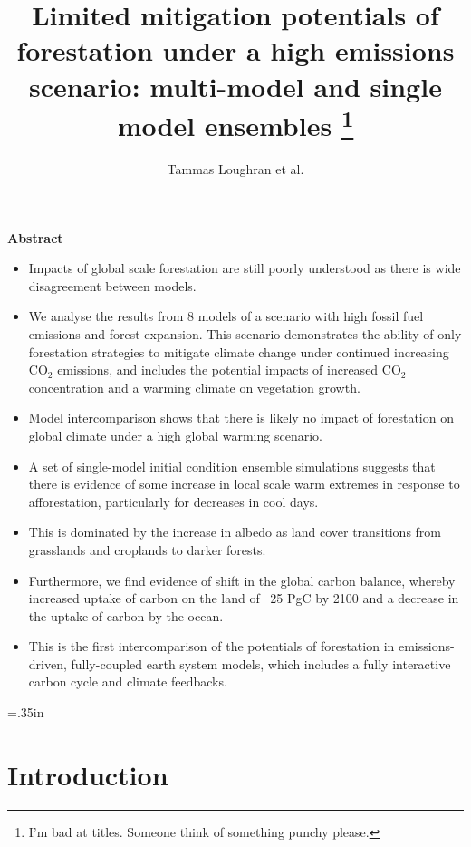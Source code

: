 \documentclass[]{article}
\title{Limited mitigation potentials of forestation under a high emissions scenario: multi-model and single model ensembles \footnote{I'm bad at titles. Someone think of something punchy please.}}
\author{Tammas Loughran et al.}
\begin{document}
\maketitle

\begin{center}
    \Large
    \vspace{0.9cm}
    \textbf{Abstract}
\end{center}

\begin{itemize}
    \item Impacts of global scale forestation are still poorly understood as there is wide disagreement between models.
    \item We analyse the results from 8 models of a scenario with high fossil fuel emissions and forest expansion. This scenario demonstrates the ability of only forestation strategies to mitigate climate change under continued increasing CO$_2$ emissions, and includes the potential impacts of increased CO$_2$ concentration and a warming climate on vegetation growth.
    \item Model intercomparison shows that there is likely no impact of forestation on global climate under a high global warming scenario.
    \item A set of single-model initial condition ensemble simulations suggests that there is evidence of some increase in local scale warm extremes in response to afforestation, particularly for decreases in cool days.
    \item This is dominated by the increase in albedo as land cover transitions from grasslands and croplands to darker forests.
    \item Furthermore, we find evidence of shift in the global carbon balance, whereby increased uptake of carbon on the land of ~25 PgC by 2100 and a decrease in the uptake of carbon by the ocean.
    \item This is the first intercomparison of the potentials of forestation in emissions-driven, fully-coupled earth system models, which includes a fully interactive carbon cycle and climate feedbacks.
\end{itemize}

\raggedright
\parindent=.35in %

\section{Introduction}
\end{document}
